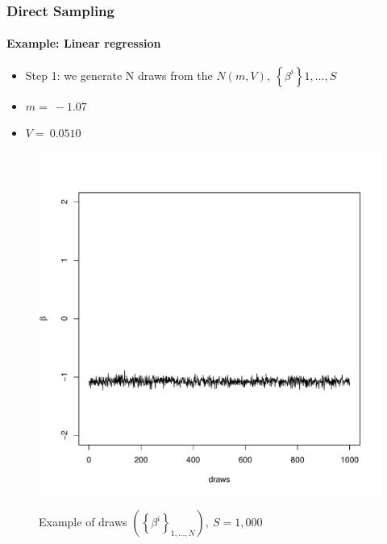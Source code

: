 \documentclass[
  shownotes,
  xcolor={svgnames},
  hyperref={colorlinks,citecolor=DarkBlue,linkcolor=DarkRed,urlcolor=DarkBlue}
  , aspectratio=169]{beamer}
\begin{document}
\begin{frame}[fragile]
\frametitle{Direct Sampling}  
\framesubtitle{Example: Linear regression}
\begin{itemize}
\item Step 1: we generate N draws from the $N\left( m,V \right),\ \left\{ \beta^{i} \right\} 1,\ldots,S$
\item $m = \  - 1.07$
\item $V = \ 0.0510$
\end{itemize}

\begin{figure}[H] \centering
  \centering
  \caption{Example of draws $\left( \left\{ \beta^{i} \right\}_{1,\ldots,N} \right),\ S = 1,000$}
  \includegraphics[scale=0.25]{figures/beta}
  \\
  \tiny 
\end{figure}

  
\end{frame}
\end{document}
